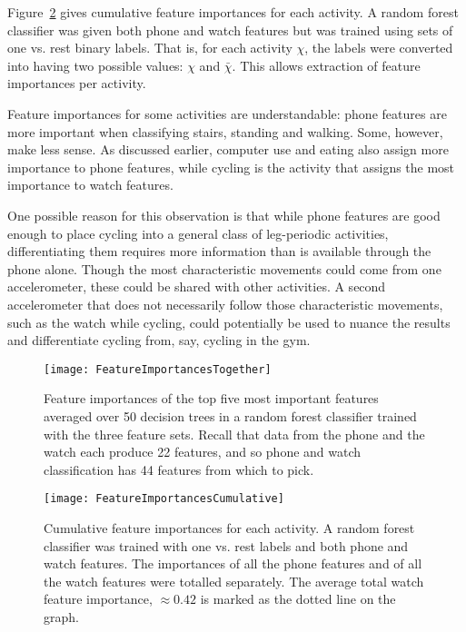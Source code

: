 {{    Figure~\ref{fig:FeatureImportancesCumulative} gives cumulative feature importances for each activity. A random forest classifier was given both phone and watch features but was trained using sets of one vs. rest binary labels. That is, for each activity $\chi$, the labels were converted into having two possible values: $\chi$ and $\bar{\chi}$. This allows extraction of feature importances per activity.
    
    Feature importances for some activities are understandable: phone features are more important when classifying stairs, standing and walking. Some, however, make less sense. As discussed earlier, computer use and eating also assign more importance to phone features, while cycling is the activity that assigns the most importance to watch features.
    
    One possible reason for this observation is that while phone features are good enough to place cycling into a general class of leg-periodic activities, differentiating them requires more information than is available through the phone alone. Though the most characteristic movements could come from one accelerometer, these could be shared with other activities. A second accelerometer that does not necessarily follow those characteristic movements, such as the watch while cycling, could potentially be used to nuance the results and differentiate cycling from, say, cycling in the gym.
    
    \begin{figure}
      \centering
      \texttt{[image: FeatureImportancesTogether]}
      \caption[Feature importances of the top five most important features]{Feature importances of the top five most important features averaged over 50 decision trees in a random forest classifier trained with the three feature sets. Recall that data from the phone and the watch each produce 22 features, and so phone and watch classification has 44 features from which to pick.}
      \label{fig:FeatureImportancesTogether}
    \end{figure}
    
    \begin{figure}
      \centering
      \texttt{[image: FeatureImportancesCumulative]}
      \caption[Cumulative feature importances for each activity]{Cumulative feature importances for each activity. A random forest classifier was trained with one vs. rest labels and both phone and watch features. The importances of all the phone features and of all the watch features were totalled separately. The average total watch feature importance, $\approx 0.42$ is marked as the dotted line on the graph.}
      \label{fig:FeatureImportancesCumulative}
    \end{figure}
}}
